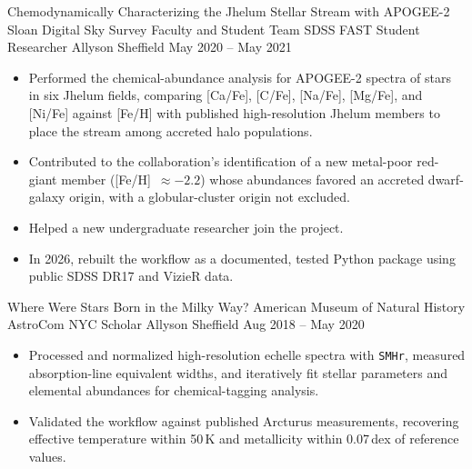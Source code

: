 \vspace{0.2em}

\researchentry
  {Chemodynamically Characterizing the Jhelum Stellar Stream with APOGEE-2}
  {Sloan Digital Sky Survey Faculty and Student Team}
  {SDSS FAST Student Researcher}
  {Allyson Sheffield}
  {May 2020 -- May 2021}
  {%
    \hspace{0.15em}
  }
\begin{itemize}[
  leftmargin=1em,
  label={--},
  itemsep=2pt,
  topsep=0pt,
  parsep=0pt,
  partopsep=0pt
]
  \item Performed the chemical-abundance analysis for APOGEE-2 spectra of stars
  in six Jhelum fields, comparing [Ca/Fe], [C/Fe], [Na/Fe], [Mg/Fe], and
  [Ni/Fe] against [Fe/H] with published high-resolution Jhelum members to
  place the stream among accreted halo populations.

  \item Contributed to the collaboration's identification of a new metal-poor
  red-giant member ([Fe/H]~$\approx -2.2$) whose abundances favored an accreted
  dwarf-galaxy origin, with a globular-cluster origin not excluded.

  \item Helped a new undergraduate researcher join the project.

  \item In 2026, rebuilt the workflow as a documented, tested Python package
  using public SDSS DR17 and VizieR data.
\end{itemize}

\vspace{0.2em}

\researchentry
  {Where Were Stars Born in the Milky Way?}
  {American Museum of Natural History}
  {AstroCom NYC Scholar}
  {Allyson Sheffield}
  {Aug 2018 -- May 2020}
  {}
\begin{itemize}[
  leftmargin=1em,
  label={--},
  itemsep=2pt,
  topsep=0pt,
  parsep=0pt,
  partopsep=0pt
]
  \item Processed and normalized high-resolution echelle spectra with
  \texttt{SMHr}, measured absorption-line equivalent widths, and iteratively
  fit stellar parameters and elemental abundances for chemical-tagging
  analysis.

  \item Validated the workflow against published Arcturus measurements,
  recovering effective temperature within 50\,K and metallicity within
  0.07\,dex of reference values.
\end{itemize}

